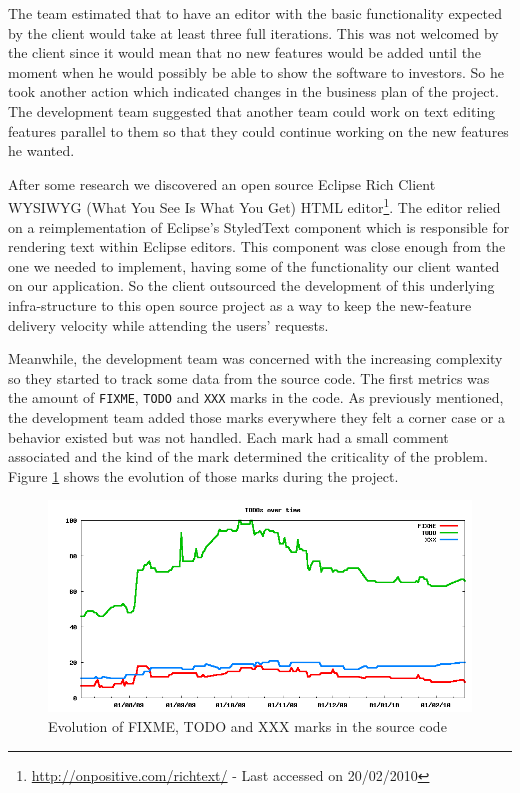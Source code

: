 \documentclass[lnbip]{svmultln}
\begin{document}
The team estimated that to have an editor with the basic functionality
expected by the client would take at least three full iterations. This
was not welcomed by the client since it would mean that no new
features would be added until the moment when he would possibly be
able to show the software to investors. So he took another action
which indicated changes in the business plan of the project.  The
development team suggested that another team could work on text
editing features parallel to them so that they could continue working
on the new features he wanted.

After some research we discovered an open source Eclipse Rich Client
WYSIWYG (What You See Is What You Get) HTML
editor\footnote{\url{http://onpositive.com/richtext/} - Last accessed
  on 20/02/2010}. The editor relied on a reimplementation of Eclipse's
StyledText component which is responsible for rendering text within
Eclipse editors. This component was close enough from the one we
needed to implement, having some of the functionality our client
wanted on our application. So the client outsourced the development of
this underlying infra-structure to this open source project as a way
to keep the new-feature delivery velocity while attending the users'
requests.

Meanwhile, the development team was concerned with the increasing
complexity so they started to track some data from the source
code. The first metrics was the amount of \texttt{FIXME},
\texttt{TODO} and \texttt{XXX} marks in the code. As previously
mentioned, the development team added those marks everywhere they felt
a corner case or a behavior existed but was not handled. Each mark had
a small comment associated and the kind of the mark determined the
criticality of the problem. Figure \ref{fig:TODOs} shows the evolution
of those marks during the project.

\begin{figure}[hbt]
  \centerline{
    \includegraphics[width=120mm]{TODOs.png}
  }
  \caption{Evolution of FIXME, TODO and XXX marks in the source code}
  \label{fig:TODOs}
\end{figure}
\end{document}
